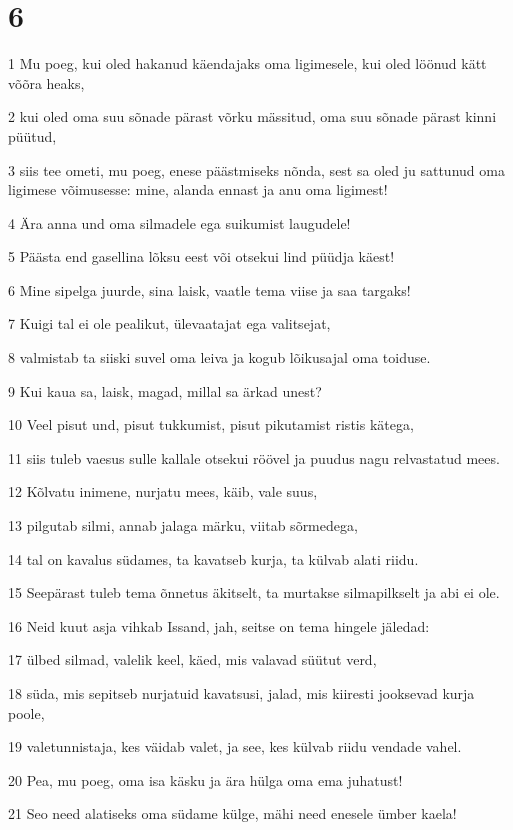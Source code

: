 \chapter{6}

\par 1 Mu poeg, kui oled hakanud käendajaks oma ligimesele, kui oled löönud kätt võõra heaks,
\par 2 kui oled oma suu sõnade pärast võrku mässitud, oma suu sõnade pärast kinni püütud,
\par 3 siis tee ometi, mu poeg, enese päästmiseks nõnda, sest sa oled ju sattunud oma ligimese võimusesse: mine, alanda ennast ja anu oma ligimest!
\par 4 Ära anna und oma silmadele ega suikumist laugudele!
\par 5 Päästa end gasellina lõksu eest või otsekui lind püüdja käest!
\par 6 Mine sipelga juurde, sina laisk, vaatle tema viise ja saa targaks!
\par 7 Kuigi tal ei ole pealikut, ülevaatajat ega valitsejat,
\par 8 valmistab ta siiski suvel oma leiva ja kogub lõikusajal oma toiduse.
\par 9 Kui kaua sa, laisk, magad, millal sa ärkad unest?
\par 10 Veel pisut und, pisut tukkumist, pisut pikutamist ristis kätega,
\par 11 siis tuleb vaesus sulle kallale otsekui röövel ja puudus nagu relvastatud mees.
\par 12 Kõlvatu inimene, nurjatu mees, käib, vale suus,
\par 13 pilgutab silmi, annab jalaga märku, viitab sõrmedega,
\par 14 tal on kavalus südames, ta kavatseb kurja, ta külvab alati riidu.
\par 15 Seepärast tuleb tema õnnetus äkitselt, ta murtakse silmapilkselt ja abi ei ole.
\par 16 Neid kuut asja vihkab Issand, jah, seitse on tema hingele jäledad:
\par 17 ülbed silmad, valelik keel, käed, mis valavad süütut verd,
\par 18 süda, mis sepitseb nurjatuid kavatsusi, jalad, mis kiiresti jooksevad kurja poole,
\par 19 valetunnistaja, kes väidab valet, ja see, kes külvab riidu vendade vahel.
\par 20 Pea, mu poeg, oma isa käsku ja ära hülga oma ema juhatust!
\par 21 Seo need alatiseks oma südame külge, mähi need enesele ümber kaela!
